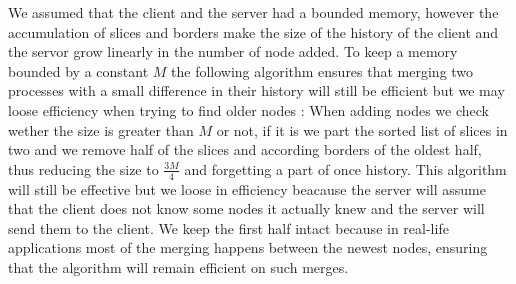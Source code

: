We assumed that the client and the server had a bounded memory, however the accumulation of slices and borders make the size of the history of the client and the servor grow linearly in the number of node added. To keep a memory bounded by a constant $M$ the following algorithm ensures that merging two processes with a small difference in their history will still be efficient but we may loose efficiency when trying to find older nodes : When adding nodes we check wether the size is greater than $M$ or not, if it is we part the sorted list of slices in two and we remove half of the slices and according borders of the oldest half, thus reducing the size to $\frac{3M}{4}$ and forgetting a part of once history. This algorithm will still be effective but we loose in efficiency beacause the server will assume that the client does not know some nodes it actually knew and the server will send them to the client. We keep the first half intact because in real-life applications most of the merging happens between the newest nodes, ensuring that the algorithm will remain efficient on such merges.